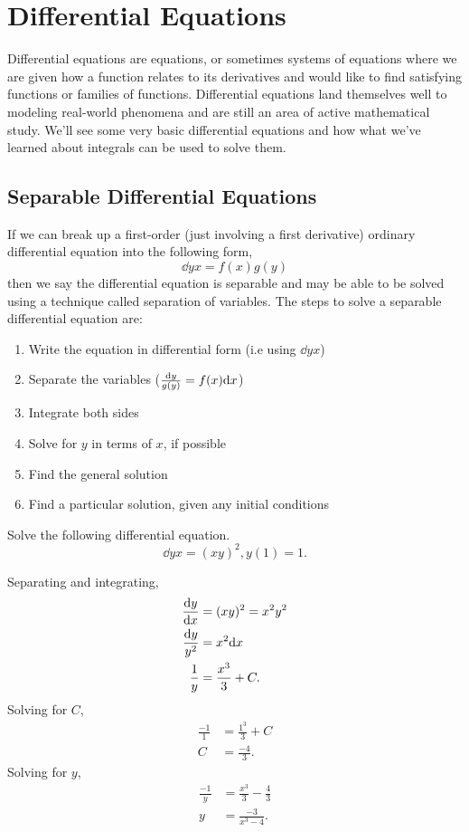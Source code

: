 \section{Differential Equations}
Differential equations are equations, or sometimes systems of equations where we are given how a function relates to its derivatives and would like to find satisfying functions or families of functions.
Differential equations land themselves well to modeling real-world phenomena and are still an area of active mathematical study.
We'll see some very basic differential equations and how what we've learned about integrals can be used to solve them.

\subsection{Separable Differential Equations}
If we can break up a first-order (just involving a first derivative) ordinary differential equation into the following form,
\begin{equation*}
	\dd{y}{x} = f(x)g(y)
\end{equation*}
then we say the differential equation is separable and may be able to be solved using a technique called separation of variables.
The steps to solve a separable differential equation are:
\begin{enumerate}
	\item Write the equation in differential form (i.e using $\dd{y}{x}$)
	\item Separate the variables ($\frac{\mathrm{d} y}{g(y)}=f(x)\mathrm{d} x$)
	\item Integrate both sides
	\item Solve for $y$ in terms of $x$, if possible
	\item Find the general solution
	\item Find a particular solution, given any initial conditions
\end{enumerate}

\begin{example}
	Solve the following differential equation.
	\begin{equation*}
		\dd{y}{x} = (xy)^2, y(1)=1.
	\end{equation*}
\end{example}
Separating and integrating,
\begin{align*}
	\frac{\mathrm{d} y}{\mathrm{d} x} &= (xy)^2 = x^2y^2 \\
	\frac{\mathrm{d} y}{y^2} &= x^2\mathrm{d} x \\
	\frac{1}{y} &= \frac{x^3}{3} + C. \\
\end{align*}
\indent
Solving for $C$,
\begin{align*}
	\frac{-1}{1} &= \frac{1^3}{3} + C \\
	C &= \frac{-4}{3}.
\end{align*}
\indent
Solving for $y$,
\begin{align*}
	\frac{-1}{y} &= \frac{x^3}{3} - \frac{4}{3} \\
	y &= \frac{-3}{x^3 - 4}.
\end{align*}

